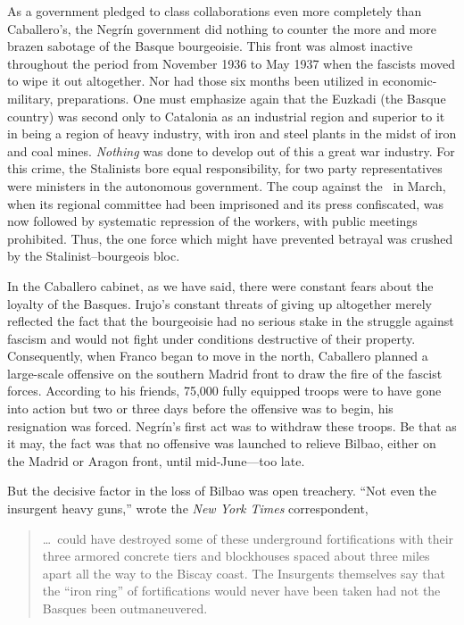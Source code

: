 \begin{sloppypar}
  As a government pledged to class collaborations even more completely than Caballero’s, the Negr\'in government did nothing to counter the more and more brazen sabotage of the Basque bourgeoisie. This front was almost inactive throughout the period from November 1936 to May 1937 when the fascists moved to wipe it out altogether. Nor had those six months been utilized in economic-military, preparations. One must emphasize again that the Euzkadi (the Basque country) was second only to Catalonia as an industrial region and superior to it in being a region of heavy industry, with iron and steel plants in the midst of iron and coal mines. \emph{Nothing} was done to develop out of this a great war industry. For this crime, the Stalinists bore equal responsibility, for two party representatives were ministers in the autonomous government. The coup against the \CNT\ in March, when its regional committee had been imprisoned and its press confiscated, was now followed by systematic repression of the workers, with public meetings prohibited. Thus, the one force which might have prevented betrayal was crushed by the Stalinist--bourgeois bloc.
\end{sloppypar}

In the Caballero cabinet, as we have said, there were constant fears about the loyalty of the Basques. Irujo’s constant threats of giving up altogether merely reflected the fact that the bourgeoisie had no serious stake in the struggle against fascism and would not fight under conditions destructive of their property. Consequently, when Franco began to move in the north, Caballero planned a large-scale offensive on the southern Madrid front to draw the fire of the fascist forces. According to his friends, 75,000 fully equipped troops were to have gone into action but two or three days before the offensive was to begin, his resignation was forced. Negr\'in’s first act was to withdraw these troops. Be that as it may, the fact was that no offensive was launched to relieve Bilbao, either on the Madrid or Aragon front, until mid-June—too late.

But the decisive factor in the loss of Bilbao was open treachery. ``Not even the insurgent heavy guns,\kn'' wrote the \emph{New York Times} correspondent,

\begin{quotation}
  \noindent
  \dots\ could have destroyed some of these underground fortifications with their three armored concrete tiers and blockhouses spaced about three miles apart all the way to the Biscay coast. The Insurgents themselves say that the “iron ring” of fortifications would never have been taken had not the Basques been outmaneuvered.
\end{quotation}


